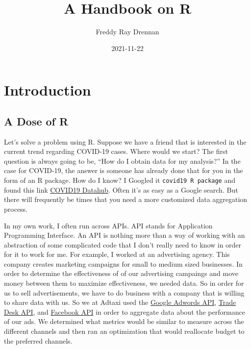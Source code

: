 \documentclass[
]{book}
\title{A Handbook on R}
\author{Freddy Ray Drennan}
\date{2021-11-22}
\begin{document}
\maketitle

{
\setcounter{tocdepth}{1}
\tableofcontents
}
\hypertarget{introduction}{%
\chapter{Introduction}\label{introduction}}

\hypertarget{a-dose-of-r}{%
\section{A Dose of R}\label{a-dose-of-r}}

Let's solve a problem using R. Suppose we have a friend that is interested in the current trend regarding COVID-19 cases. Where would we start? The first question is always going to be, ``How do I obtain data for my analysis?'' In the case for COVID-19, the answer is someone has already done that for you in the form of an R package. How do I know? I Googled it \texttt{covid19\ R\ package} and found this link \href{https://covid19datahub.io/articles/r.html}{COVID19 Datahub}. Often it's as easy as a Google search. But there will frequently be times that you need a more customized data aggregation process.

In my own work, I often run across APIs. API stands for Application Programming Interface. An API is nothing more than a way of working with an abstraction of some complicated code that I don't really need to know in order for it to work for me. For example, I worked at an advertising agency. This company creates marketing campaigns for small to medium sized businesses. In order to determine the effectiveness of of our advertising campaings and move money between them to maximize effectiveness, we needed data. So in order for us to sell advertisements, we have to do business with a company that is willing to share data with us. So we at Adtaxi used the \href{https://developers.google.com/adwords/api/docs/guides/start}{Google Adwords API}, \href{https://api.thetradedesk.com/v3/portal/api/doc/ApiOverview}{Trade Desk API}, and \href{https://developers.facebook.com/docs/marketing-api/reference/ad-campaign/}{Facebook API} in order to aggregate data about the performance of our ads. We determined what metrics would be similar to measure across the different channels and then ran an optimization that would reallocate budget to the preferred channels.
\end{document}
